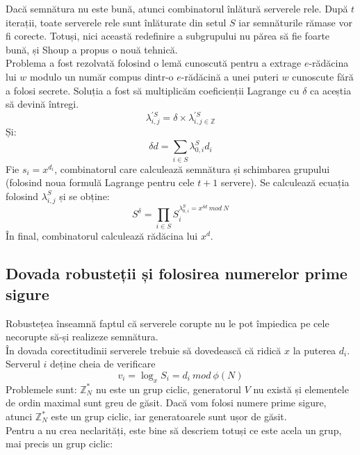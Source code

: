 \documentclass[12]{report}
\begin{document}
Dacă semnătura nu este bună, atunci combinatorul înlătură serverele rele. După $t$ iterații, toate serverele rele sunt înlăturate din setul $S$ iar semnăturile rămase vor fi corecte. Totuși, nici această redefinire a subgrupului nu părea să fie foarte bună, și Shoup a propus o nouă tehnică. \\
Problema a fost rezolvată folosind o lemă cunoscută pentru a extrage $e$-rădăcina lui $w$ modulo un număr compus dintr-o $e$-rădăcină a unei puteri $w$ cunoscute fără a folosi secrete. Soluția a fost să multiplicăm coeficienții Lagrange cu $\delta$ ca aceștia să devină întregi. 
$$ \lambda_{i,j}^{'S} = \delta \times \lambda_{i,j \in \mathbb{Z}}^{'S} $$
Și:
$$ \delta d = \sum_{i \in S}^{} \lambda_{0,i}^{S} d_i $$
Fie $ s_i = x^{d_i} $, combinatorul care calculează semnătura și schimbarea grupului (folosind noua formulă Lagrange pentru cele $t+1$ servere). Se calculează ecuația folosind $\lambda_{i,j}^{S} $ și se obține:
$$S^{\delta} = \prod_{i \in S}^{} S_{i}^{\lambda_{0,i}^{S} = x^{\delta d} \ mod \ N}$$
În final, combinatorul calculează rădăcina lui $x^d$.

\subsection{Dovada robusteții și folosirea numerelor prime sigure}
Robustețea înseamnă faptul că serverele corupte nu le pot împiedica pe cele necorupte să-și realizeze semnătura. \\
În dovada corectitudinii serverele trebuie să dovedească că ridică $x$ la puterea $d_i$. Serverul $i$ deține cheia de verificare
$$ v_i = \log_{x} S_i = d_i \ mod \ \phi(N)$$
Problemele sunt: $\mathbb{Z}_{N}^{*}$ nu este un grup ciclic,  generatorul $V$ nu există și elementele de ordin maximal sunt greu de găsit. Dacă vom folosi numere prime sigure, atunci $\mathbb{Z}_{N}^{*}$ este un grup ciclic, iar generatoarele sunt ușor de găsit. \\
Pentru a nu crea neclarități, este bine să descriem totuși ce este acela un grup, mai precis un grup ciclic: 
\end{document}
